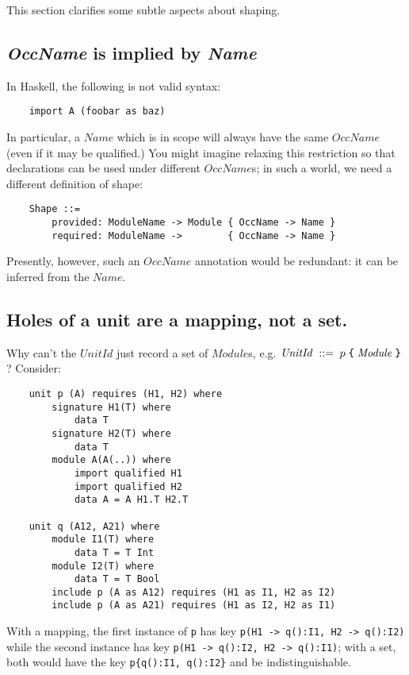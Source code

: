 \documentclass{article}
\newcommand{\I}[1]{\ensuremath{\mathit{#1}}}
\begin{document}
This section clarifies some subtle aspects about shaping.

\subsection{\textit{OccName} is implied by \textit{Name}}
In Haskell, the following is not valid syntax:

\begin{verbatim}
    import A (foobar as baz)
\end{verbatim}
In particular, a \I{Name} which is in scope will always have the same
\I{OccName} (even if it may be qualified.)  You might imagine relaxing
this restriction so that declarations can be used under different \I{OccName}s;
in such a world, we need a different definition of shape:

\begin{verbatim}
    Shape ::=
        provided: ModuleName -> Module { OccName -> Name }
        required: ModuleName ->        { OccName -> Name }
\end{verbatim}
Presently, however, such an \I{OccName} annotation would be redundant: it can be inferred from the \I{Name}.

\subsection{Holes of a unit are a mapping, not a set.}

Why can't the \I{UnitId} just record a
set of \I{Module}s, e.g. $\I{UnitId}\;::= \; p \; \verb|{| \; \I{Module} \; \verb|}|$?  Consider:

\begin{verbatim}
    unit p (A) requires (H1, H2) where
        signature H1(T) where
            data T
        signature H2(T) where
            data T
        module A(A(..)) where
            import qualified H1
            import qualified H2
            data A = A H1.T H2.T

    unit q (A12, A21) where
        module I1(T) where
            data T = T Int
        module I2(T) where
            data T = T Bool
        include p (A as A12) requires (H1 as I1, H2 as I2)
        include p (A as A21) requires (H1 as I2, H2 as I1)
\end{verbatim}
With a mapping, the first instance of \verb|p| has key \verb|p(H1 -> q():I1, H2 -> q():I2)|
while the second instance has key \verb|p(H1 -> q():I2, H2 -> q():I1)|; with
a set, both would have the key \verb|p{q():I1, q():I2}| and be
indistinguishable.
\end{document}
